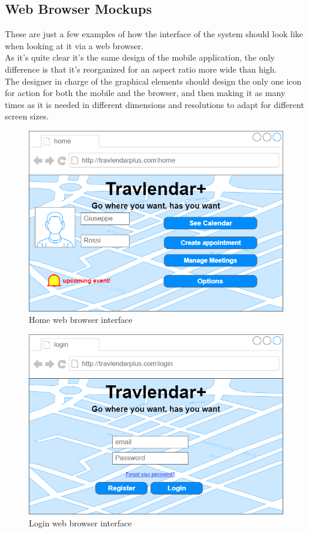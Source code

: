 \subsection{Web Browser Mockups}
These are just a few examples of how the interface of the system should look like when looking at it via a web browser.\\
As it's quite clear it's the same design of the mobile application, the only difference is that it's reorganized for an aspect ratio more wide than high.\\
The designer in charge of the graphical elements should design the only one icon for action for both the mobile and the browser, and then making it as many times as it is needed in different dimensions and resolutions to adapt for different screen sizes.

\begin{figure}[h]
\centering
\includegraphics[height=.4\textheight, keepaspectratio=true]{Img/HomeDesktop}
  \caption{Home web browser interface}
\end{figure}

\begin{figure}[h]
\centering
\includegraphics[height=.4\textheight, keepaspectratio=true]{Img/LoginDesktop}
  \caption{Login web browser interface}
\end{figure}

